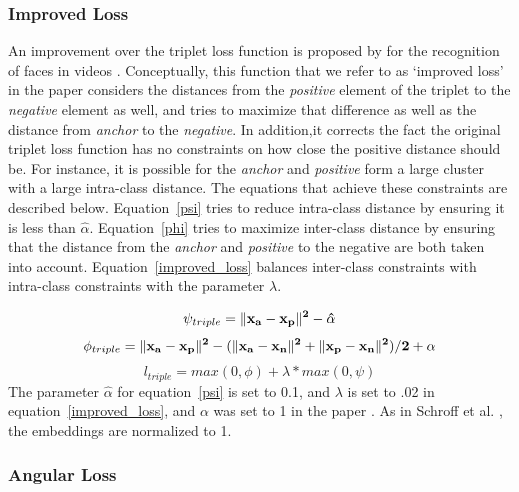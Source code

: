 \subsubsection{Improved Loss}

 An improvement over the triplet loss function is proposed by \cite{DBLP:conf/cvpr/SchroffKP15} for the recognition of faces in videos \cite{Zhang:2016:DML:3088616.3088665}.  Conceptually, this function that we refer to as `improved loss' in the paper considers the distances from the \textit{positive} element of the triplet to the \textit{negative} element as well, and tries to maximize that difference as well as the distance from \textit{anchor} to the \textit{negative}.  In addition,it corrects the fact the  original triplet loss function has no constraints on how close the positive distance should be.  For instance, it is possible for the \textit{anchor} and \textit{positive} form a large cluster with a large intra-class distance. The equations that achieve these constraints are described below.  Equation~\ref{psi} tries to reduce intra-class distance by ensuring it is less than $\hat{\alpha}$.  Equation~\ref{phi} tries to maximize inter-class distance by ensuring that the distance from the \textit{anchor} and \textit{positive} to the negative are both taken into account.  Equation~\ref{improved_loss} balances inter-class constraints with intra-class constraints with the parameter $\lambda$. 

\begin{equation}
  \psi_{triple} = \|\bf{x_{a}} - \bf{x_{p}}\|^2 - \hat{\alpha}
\label{psi}
\end{equation}
\begin{equation}
  \phi_{triple} = \|\bf{x_{a}} - \bf{x_{p}}\|^2 - (\|\bf{x_{a}}- \bf{x_{n}}\|^2 + \|\bf{x_{p}} - \bf{x_{n}}\|^2) / 2  + \alpha
\label{phi}
\end{equation}
\begin{equation}
  l_{triple} = max(0, \phi) + \lambda * max(0, \psi)
\label{improved_loss}
\end{equation}
The parameter $\hat{\alpha}$ for equation~\ref{psi} is set to 0.1, and $\lambda$ is set to .02 in equation~\ref{improved_loss}, and $\alpha$ was set to 1 in the paper \cite{Zhang:2016:DML:3088616.3088665}.  As in Schroff et al. \cite{DBLP:conf/cvpr/SchroffKP15}, the embeddings are normalized to 1.

\subsubsection{Angular Loss}

